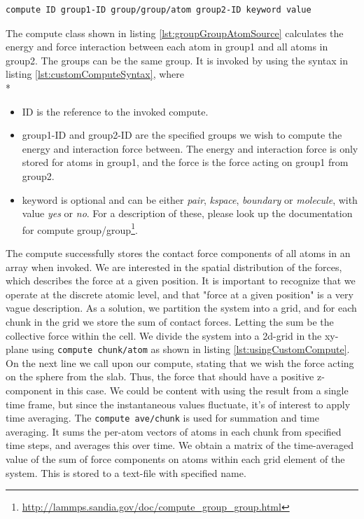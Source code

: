 \documentclass[twoside,english]{uiofysmaster}
\begin{document}
 \begin{lstlisting}[language=LammpsInput, caption={Syntax for using custom compute}, label={lst:customComputeSyntax} ]
	compute ID group1-ID group/group/atom group2-ID keyword value
\end{lstlisting}
The compute class shown in listing \ref{lst:groupGroupAtomSource} calculates the energy and force interaction between each atom in group1 and all atoms in group2. The groups can be the same group. It is invoked by using the syntax in listing \ref{lst:customComputeSyntax},
where \\*
\begin{itemize}
	\item ID is the reference to the invoked compute.
	\item group1-ID and group2-ID are the specified groups we wish to compute the energy and interaction force between. The energy and interaction force is only stored for atoms in group1, and the force is the force acting on group1 from group2.
	\item keyword is optional and can be either \textit{pair}, \textit{kspace}, \textit{boundary} or \textit{molecule}, with value \textit{yes} or \textit{no}. For a description of these, please look up the documentation for compute group/group\footnote{\href{http://lammps.sandia.gov/doc/compute_group_group.html}{\url{http://lammps.sandia.gov/doc/compute_group_group.html}}}. 
\end{itemize}
The compute successfully stores the contact force components of all atoms in an array when invoked. 
We are interested in the spatial distribution of the forces, which describes the force at a given position. 
It is important to recognize that we operate at the discrete atomic level, and that "force at a given position" is a very vague description. 
As a solution, we partition the system into a grid, and for each chunk in the grid we store the sum of contact forces. Letting the sum be the collective force within the cell.
We divide the system into a 2d-grid in the xy-plane using  \texttt{compute chunk/atom} as shown in listing \ref{lst:usingCustomCompute}.
On the next line we call upon our compute, stating that we wish the force acting on the sphere from the slab. 
Thus, the force that should have a positive z-component in this case. 
We could be content with using the result from a single time frame, but since the instantaneous values fluctuate, it's of interest to apply time averaging. 
The \texttt{compute ave/chunk} is used for summation and time averaging.  
It sums the  per-atom vectors of atoms in each chunk from specified time steps, and averages this over time. 
We obtain a matrix of the time-averaged value of the sum of force components on atoms within each grid element of the system.
This is stored to a text-file with specified name. 
\end{document}
